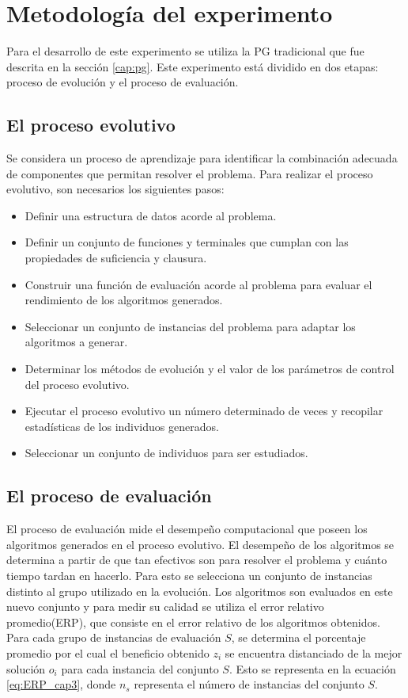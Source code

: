 \section{Metodología del experimento}
\label{cap:experimento_tradicional}

Para el desarrollo de este experimento se utiliza la PG tradicional que fue descrita en la sección \ref{cap:pg}. Este experimento está dividido en dos etapas: proceso de evolución y el proceso de evaluación.

\subsection{El proceso evolutivo}

Se considera un proceso de aprendizaje para identificar la combinación adecuada de componentes que permitan resolver el problema. Para realizar el proceso evolutivo, son necesarios los siguientes pasos:

\begin{itemize}
  \item Definir una estructura de datos acorde al problema.
  \item Definir un conjunto de funciones y terminales que cumplan con las propiedades de suficiencia y clausura.
  \item Construir una función de evaluación acorde al problema para evaluar el rendimiento de los algoritmos generados.
  \item Seleccionar un conjunto de instancias del problema para adaptar los algoritmos a generar.
  \item Determinar los métodos de evolución y el valor de los parámetros de control del proceso evolutivo.
  \item Ejecutar el proceso evolutivo un número determinado de veces y recopilar estadísticas de los individuos generados.
  \item Seleccionar un conjunto de individuos para ser estudiados.
\end{itemize}

\subsection{El proceso de evaluación}

El proceso de evaluación mide el desempeño computacional que poseen los algoritmos generados en el proceso evolutivo. El desempeño de los algoritmos se determina a partir de que tan efectivos son para resolver el problema y cuánto tiempo tardan en hacerlo. Para esto se selecciona un conjunto de instancias distinto al grupo utilizado en la evolución. Los algoritmos son evaluados en este nuevo conjunto y para medir su calidad se utiliza el error relativo promedio(ERP), que consiste en el error relativo de los algoritmos obtenidos. Para cada grupo de instancias de evaluación $S$, se determina el porcentaje promedio por el cual el beneficio obtenido $z_{i}$ se encuentra distanciado de la mejor solución $o_{i}$ para cada instancia del conjunto $S$. Esto se representa en la ecuación \ref{eq:ERP_cap3}, donde $n_{s}$ representa el número de instancias del conjunto $S$.

